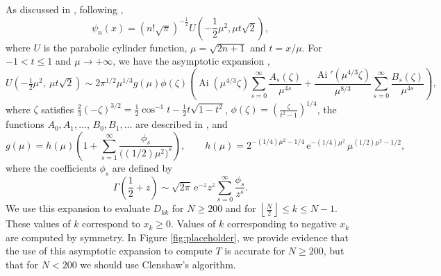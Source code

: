 \documentclass[10pt]{article}
\numberwithin{theorem}{section}
\begin{document}
As discussed in \cite{townsend2016fast}, following \cite[12.7]{NIST:DLMF},
\begin{equation}
    \psi_n(x) = (n!\sqrt{\pi})^{-\tfrac12} U\left( -\frac12\mu^2, \mu t \sqrt{2} \right),
\end{equation}
where $U$ is the parabolic cylinder function, $\mu = \sqrt{2n+1}$ and $t = x/\mu$. For $-1 < t \leq 1$ and $\mu \to +\infty$, we have the asymptotic expansion \cite[12.10.35]{NIST:DLMF},
$$
U\!\left(-\tfrac{1}{2}\mu^2,\ \mu t\sqrt{2}\right)
\sim 2\pi^{1/2}\mu^{1/3} g(\mu)\phi(\zeta)
\left(
\operatorname{Ai}(\mu^{4/3}\zeta)\sum_{s=0}^{\infty}\frac{A_s(\zeta)}{\mu^{4s}}
+
\frac{\operatorname{Ai}'(\mu^{4/3}\zeta)}{\mu^{8/3}}
\sum_{s=0}^{\infty}\frac{B_s(\zeta)}{\mu^{4s}}
\right),
$$
where $\zeta$  satisfies
$\frac{2}{3}(-\zeta)^{3/2}=
\frac{1}{2}\cos^{-1} t - \frac{1}{2}t\sqrt{1-t^2}$,
$\phi(\zeta) = \left(\frac{\zeta}{t^2 - 1}\right)^{1/4}$,  the functions $A_0,A_1,\ldots$, $B_0, B_1,\ldots$ are described in \cite[12.10.42]{NIST:DLMF}, and
$$
g(\mu) = h(\mu)\left(1 + \sum_{s=1}^{\infty} \frac{\phi_s}{\big((1/2)\mu^2\big)^s} \right), \qquad h(\mu) = 2^{-(1/4)\mu^2 - 1/4} \, \mathrm{e}^{-(1/4)\mu^2} \, \mu^{(1/2)\mu^2 - 1/2},
$$
where the coefficients $\phi_s$ are defined by
$$
\Gamma\!\left(\frac{1}{2} + z\right)
\sim \sqrt{2\pi}\, \mathrm{e}^{-z} z^z \sum_{s=0}^{\infty} \frac{\phi_s}{z^s}.
$$
We use this expansion to evaluate $D_{kk}$ for $N \geq 200$ and for $\left\lfloor \frac{N}{2}\right\rfloor \leq k \leq N-1$. These values of $k$ correspond to $x_k \geq 0$. Values of $k$ corresponding to negative $x_k$ are computed by symmetry. In Figure \ref{fig:placeholder}, we provide evidence that the use of this asymptotic expansion to compute $T$ is accurate for $N \geq 200$, but that for $N < 200$ we should use Clenshaw's algorithm.
\end{document}
